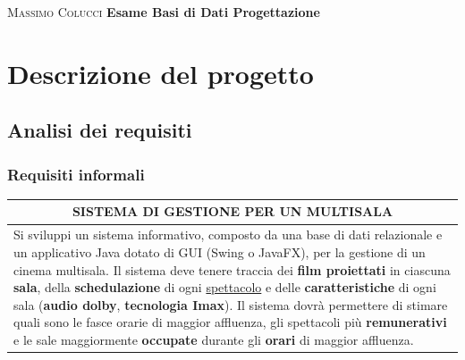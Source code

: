 \documentclass[12pt,a4paper]{book}
\begin{document}
	\pagestyle{empty}
	\noindent
	\begin{minipage}[c][\textheight][c]{\textwidth}\centering
		\textsc{\Large Massimo Colucci}
		\vfill
		\textbf{\Huge Esame Basi di Dati  Progettazione}
		\vfill
		\Large{}
	\end{minipage}
	\newpage
	\pagestyle{plain}
	\tableofcontents
	\chapter{Descrizione del progetto}
	\section{Analisi dei requisiti}
	\subsection{Requisiti informali}
	\begin{center}	
	\begin{tabular}{|p{15cm}|}
		\hline
		\multicolumn{1}{c}{SISTEMA DI GESTIONE PER UN MULTISALA}\\
		\hline
		Si sviluppi un sistema informativo, composto da una base di dati relazionale e un applicativo Java dotato di GUI (Swing o JavaFX), per la gestione di un cinema multisala. Il sistema deve tenere traccia dei \textbf{film proiettati} in ciascuna \textbf{sala}, della \textbf{schedulazione} di ogni \underline{spettacolo} e delle \textbf{caratteristiche} di ogni sala (\textbf{audio dolby}, \textbf{tecnologia Imax}). Il sistema dovrà permettere di stimare quali sono le fasce orarie di maggior affluenza, gli spettacoli più \textbf{remunerativi} e le sale maggiormente \textbf{occupate} durante gli \textbf{orari} di maggior affluenza.\\
		\hline
	\end{tabular}
	\end{center}
	\newpage
\end{document}
